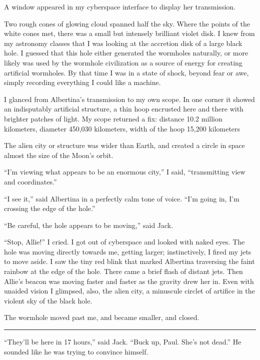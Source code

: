 \documentclass[english,11pt,letterpaper,onecolumn]{scrbook}
\begin{document}
	A window appeared in my cyberspace interface to display her transmission.

	Two rough cones of glowing cloud spanned half the sky.  Where the points of the white cones met, there was a small but intensely brilliant violet disk.  I knew from my astronomy classes that I was looking at the accretion disk of a large black hole.  I guessed that this hole either generated the wormholes naturally, or more likely was used by the wormhole civilization as a source of energy for creating artificial wormholes.  By that time I was in a state of shock, beyond fear or awe, simply recording everything I could like a machine.

	I glanced from Albertina's transmission to my own scope.  In one corner it showed an indisputably artificial structure, a thin hoop encrusted here and there with brighter patches of light.  My scope returned a fix:  distance 10.2 million kilometers, diameter 450,030 kilometers, width of the hoop 15,200 kilometers

	The alien city or structure was wider than Earth, and created a circle in space almost the size of the Moon's orbit.

	``I'm viewing what appears to be an enormous city,'' I said, ``transmitting view and coordinates.''

	``I see it,'' said Albertina in a perfectly calm tone of voice.  ``I'm going in, I'm crossing the edge of the hole.''

	``Be careful, the hole appears to be moving,'' said Jack.

	``Stop, Allie!'' I cried.  I got out of cyberspace and looked with naked eyes.  The hole was moving directly towards me, getting larger; instinctively, I fired my jets to move aside.  I saw the tiny red blink that marked Albertina traversing the faint rainbow at the edge of the hole.  There came a brief flash of distant jets.  Then Allie's beacon was moving faster and faster as the gravity drew her in.  Even with unaided vision I glimpsed, also, the alien city, a minuscule circlet of artifice in the violent sky of the black hole.

	The wormhole moved past me, and became smaller, and closed.

\begin{center}\rule[3pt]{2in}{0.5pt}\end{center}

	``They'll be here in 17 hours,'' said Jack.  ``Buck up, Paul.  She's not dead.''  He sounded like he was trying to convince himself.
\end{document}
